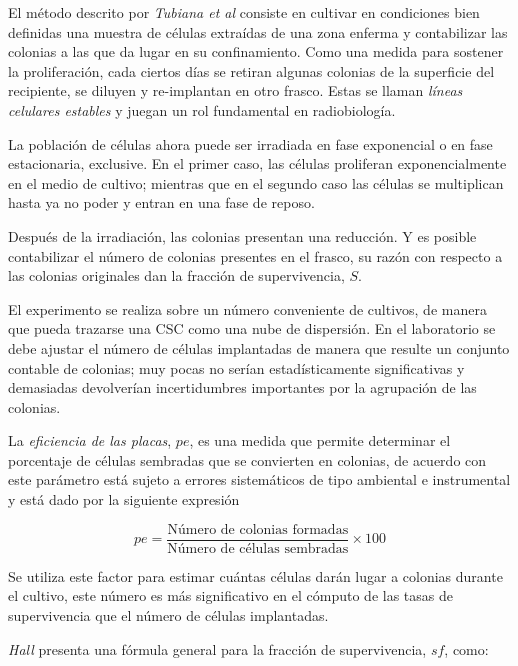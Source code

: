 \documentclass[12pt,letterpaper, oneside]{book}
\begin{document}
				El método descrito por \textit{Tubiana et al} consiste en cultivar en condiciones bien definidas una muestra de células extraídas de una zona enferma y contabilizar las colonias a las que da lugar en su confinamiento. Como una medida para sostener la proliferación, cada ciertos días se retiran algunas colonias de la superficie del recipiente, se diluyen y re-implantan en otro frasco. Estas se llaman \textit{líneas celulares estables} y juegan un rol fundamental en radiobiología\cite{Hall.2000}.
			
				La población de células ahora puede ser irradiada en fase exponencial o en fase estacionaria, exclusive. En el primer caso, las células proliferan exponencialmente en el medio de cultivo; mientras que en el segundo caso las células se multiplican hasta ya no poder y entran en una fase de reposo\cite{Tubiana.1990}. 
			
				Después de la irradiación, las colonias presentan una reducción. Y es posible contabilizar el número de colonias presentes en el frasco, su razón con respecto a las colonias originales dan la fracción de supervivencia, $S$\cite{Tubiana.1990, Hall.2000}. 
			
				El experimento se realiza sobre un número conveniente de cultivos, de manera que pueda trazarse una CSC como una nube de dispersión\cite{Tubiana.1990, Hall.2000}. En el laboratorio se debe ajustar el número de células implantadas de manera que resulte un conjunto contable de colonias; muy pocas no serían estadísticamente significativas y demasiadas devolverían incertidumbres importantes por la agrupación de las colonias\cite{Hall.2000}.
				
				La \textit{eficiencia de las placas}, $pe$, es una medida que permite determinar el porcentaje de células sembradas que se convierten en colonias, de acuerdo con \cite{Hall.2000} este parámetro está sujeto a errores sistemáticos de tipo ambiental e instrumental y está dado por la siguiente expresión
				
				\begin{equation}
					pe=\frac{\textrm{Número de colonias formadas}}{\textrm{Número de células sembradas}}\times 100
				\end{equation}
				
				Se utiliza este factor para estimar cuántas células darán lugar a colonias durante el cultivo\cite{Hall.2000}, este número es más significativo en el cómputo de las tasas de supervivencia que el número de células implantadas.
				
				\textit{Hall} presenta una fórmula general para la fracción de supervivencia, $sf$, como:
\end{document}
